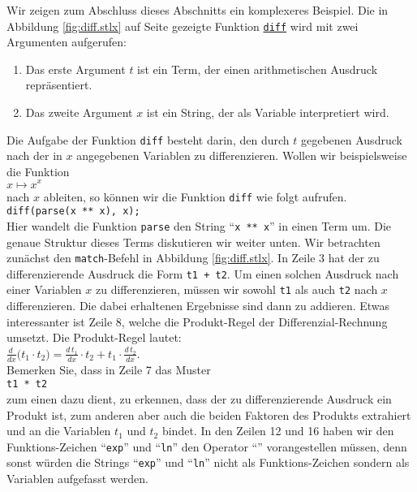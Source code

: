 \noindent
Wir zeigen zum Abschluss dieses Abschnitts ein komplexeres Beispiel.  Die in Abbildung
\ref{fig:diff.stlx} auf Seite \pageref{fig:diff.stlx} gezeigte Funktion
\href{https://github.com/karlstroetmann/Logik/blob/master/SetlX/diff.stlx}{\texttt{diff}}
wird mit zwei Argumenten aufgerufen:
\begin{enumerate}
\item Das erste  Argument $t$ ist ein Term, der einen arithmetischen Ausdruck repräsentiert.
\item Das zweite Argument $x$ ist ein String, der als Variable interpretiert wird.
\end{enumerate}
Die Aufgabe der Funktion \texttt{diff} besteht darin, den durch $t$ gegebenen Ausdruck nach der
in $x$ angegebenen Variablen zu differenzieren.  Wollen wir beispielsweise die Funktion
\\[0.2cm]
\hspace*{1.3cm}
$x \mapsto x^x$
\\[0.2cm]
nach $x$ ableiten, so können wir die Funktion \texttt{diff} wie folgt aufrufen.
\\[0.2cm]
\hspace*{1.3cm}
\texttt{diff(parse(x ** x), x);}
\\[0.2cm]
Hier wandelt die Funktion \texttt{parse} den String ``\texttt{x ** x}'' in einen Term um.  Die
genaue Struktur dieses Terms diskutieren wir weiter unten.  Wir betrachten
zunächst den \texttt{match}-Befehl in  Abbildung \ref{fig:diff.stlx}.  
In Zeile  3 hat der zu differenzierende Ausdruck die Form
\texttt{t1 + t2}.  Um einen solchen Ausdruck nach einer Variablen $x$ zu differenzieren, müssen wir
sowohl  \texttt{t1} als auch \texttt{t2} nach $x$ differenzieren.  Die dabei erhaltenen Ergebnisse
sind dann zu addieren.  Etwas interessanter ist Zeile 8, welche die Produkt-Regel der
Differenzial-Rechnung umsetzt.  Die Produkt-Regel lautet:
\\[0.2cm]
\hspace*{1.3cm}
$\displaystyle \frac{d\;}{dx} \bigl(t_1 \cdot t_2\bigr) = \frac{d\, t_1}{dx} \cdot t_2 + t_1 \cdot \frac{d\,t_2}{dx}$.
\\[0.2cm]
Bemerken Sie, dass in Zeile 7 das Muster
\\[0.2cm]
\hspace*{1.3cm}
\texttt{t1 * t2}
\\[0.2cm]
zum einen dazu dient, zu erkennen, dass der zu differenzierende Ausdruck ein Produkt ist, zum
anderen aber auch die beiden Faktoren des Produkts extrahiert und an die Variablen $t_1$ und $t_2$ bindet.
In den Zeilen  12 und 16 haben wir den Funktions-Zeichen ``\texttt{exp}'' und ``\texttt{ln}'' den
 Operator ``\texttt{}'' vorangestellen müssen, denn sonst würden die Strings
 ``\texttt{exp}'' und ``\texttt{ln}'' nicht als Funktions-Zeichen sondern als Variablen
 aufgefasst werden. 

